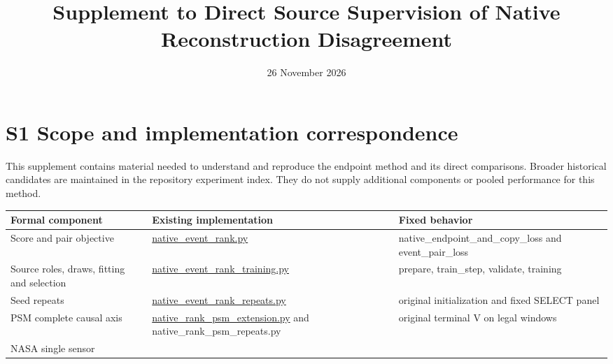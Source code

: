 \documentclass[
  english,
  9pt,
]{article}
\title{Supplement to Direct Source Supervision of Native Reconstruction
Disagreement}
\author{}
\date{26 November 2026}
\begin{document}
\maketitle

\section{S1 Scope and implementation
correspondence}\label{s1-scope-and-implementation-correspondence}

This supplement contains material needed to understand and reproduce the
endpoint method and its direct comparisons. Broader historical
candidates are maintained in the repository experiment index. They do
not supply additional components or pooled performance for this method.

\begin{longtable}[]{@{}
  >{\raggedright\arraybackslash}p{}
  >{\raggedright\arraybackslash}p{}
  >{\raggedright\arraybackslash}p{}@{}}
\toprule\noalign{}
\begin{minipage}[b]{\linewidth}\raggedright
Formal component
\end{minipage} & \begin{minipage}[b]{\linewidth}\raggedright
Existing implementation
\end{minipage} & \begin{minipage}[b]{\linewidth}\raggedright
Fixed behavior
\end{minipage} \\
\midrule\noalign{}
\endhead
\bottomrule\noalign{}
\endlastfoot
Score and pair objective &
\href{../../src/hybrid_tsad/native_event_rank.py}{native\_event\_rank.py}
& native\_endpoint\_and\_copy\_loss and event\_pair\_loss \\
Source roles, draws, fitting and selection &
\href{../../src/hybrid_tsad/native_event_rank_training.py}{native\_event\_rank\_training.py}
& prepare, train\_step, validate, training \\
Seed repeats &
\href{../../src/hybrid_tsad/native_event_rank_repeats.py}{native\_event\_rank\_repeats.py}
& original initialization and fixed SELECT panel \\
PSM complete causal axis &
\href{../../src/hybrid_tsad/native_rank_psm_extension.py}{native\_rank\_psm\_extension.py}
and native\_rank\_psm\_repeats.py & original terminal V on legal
windows \\
NASA single sensor &

\end{longtable}
\end{document}
